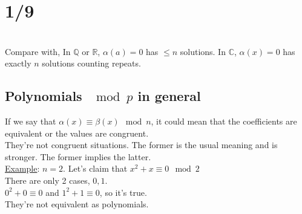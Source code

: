 \section*{1/9}
  \\
  Compare with, In $\mathbb{Q}$ or $\mathbb{R}$, $\alpha(a) = 0$ has $\le n$
  solutions. In $\mathbb{C}$, $\alpha(x) = 0$ has exactly $n$ solutions counting
  repeats.\\
  \subsection*{Polynomials $\mod p$ in general}
    If we say that $\alpha(x) \equiv \beta(x) \mod n$, it could mean that
    the coefficients are equivalent or the values are congruent.\\
    They're not congruent situations. The former is the usual meaning and is
    stronger. The former implies the latter.\\
    \underline{Example}: $n=2$. Let's claim that $x^2 + x \equiv 0 \mod 2$\\
    There are only 2 cases, $0,1$.\\
    $0^2 + 0 \equiv 0$ and $1^2 + 1 \equiv 0$, so it's true.\\
    They're not equivalent as polynomials.
